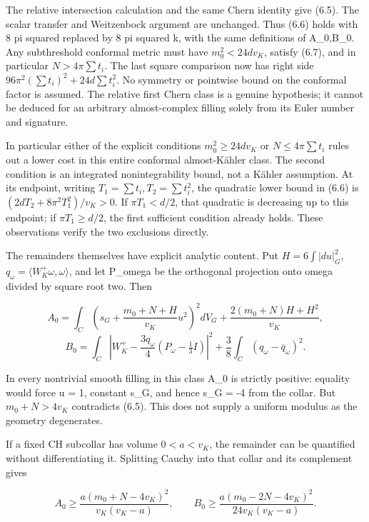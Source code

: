 \documentclass[
  10pt,
]{article}
\begin{document}
The relative intersection calculation and the same Chern identity give
(6.5). The scalar transfer and Weitzenbock argument are unchanged. Thus
(6.6) holds with 8 pi squared replaced by 8 pi squared k, with the same
definitions of A\_0,B\_0. Any subthreshold conformal metric must have
\(m_0^2<24dv_K\), satisfy (6.7), and in particular \(N>4\pi\sum t_i\).
The last square comparison now has right side
\(96\pi^2(\sum t_i)^2+24d\sum t_i^2\). No symmetry or pointwise bound on
the conformal factor is assumed. The relative first Chern class is a
genuine hypothesis; it cannot be deduced for an arbitrary almost-complex
filling solely from its Euler number and signature.

In particular either of the explicit conditions \(m_0^2\ge24dv_K\) or
\(N\le4\pi\sum t_i\) rules out a lower cost in this entire conformal
almost-Kähler class. The second condition is an integrated
nonintegrability bound, not a Kähler assumption. At its endpoint,
writing \(T_1=\sum t_i,T_2=\sum t_i^2\), the quadratic lower bound in
(6.6) is \((2dT_2+8\pi^2T_1^2)/v_K>0\). If \(\pi T_1<d/2\), that
quadratic is decreasing up to this endpoint; if \(\pi T_1\ge d/2\), the
first sufficient condition already holds. These observations verify the
two exclusions directly.

The remainders themselves have explicit analytic content. Put
\(H=6\int|du|_G^2\), \(q_\omega=\langle W_K^+\omega,\omega\rangle\), and
let P\_omega be the orthogonal projection onto omega divided by square
root two. Then

\[
 A_0=\int_C\left(s_G+\frac{m_0+N+H}{v_K}u^2\right)^2dV_G
                  +\frac{2(m_0+N)H+H^2}{v_K},
\] \[
 B_0=\int_C\left|W_K^+-\frac{3q_\omega}{4}
                  (P_\omega-\tfrac13I)\right|^2
             +\frac38\int_C(q_\omega-\overline q_\omega)^2.
                                                               \tag{6.7a}
\]

In every nontrivial smooth filling in this class A\_0 is strictly
positive: equality would force u = 1, constant s\_G, and hence s\_G = -4
from the collar. But \(m_0+N>4v_K\) contradicts (6.5). This does not
supply a uniform modulus as the geometry degenerates.

If a fixed CH subcollar has volume \(0<a<v_K\), the remainder can be
quantified without differentiating it. Splitting Cauchy into that collar
and its complement gives

\[
 A_0\ge\frac{a(m_0+N-4v_K)^2}{v_K(v_K-a)},\qquad
 B_0\ge\frac{a(m_0-2N-4v_K)^2}{24v_K(v_K-a)}.             \tag{6.7b}
\]
\end{document}
